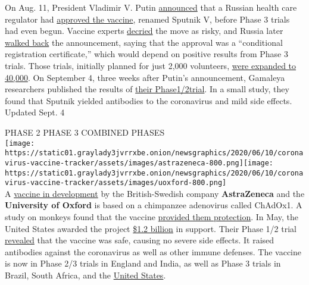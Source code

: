 On Aug. 11, President Vladimir V. Putin
\href{https://www.nytimes3xbfgragh.onion/2020/08/11/world/coronavirus-covid-19.html\#link-b092b4d}{announced}
that a Russian health care regulator had
\href{https://www.nytimes3xbfgragh.onion/2020/08/11/world/europe/russia-coronavirus-vaccine.html}{approved
the vaccine}, renamed Sputnik V, before Phase 3 trials had even begun.
Vaccine experts
\href{https://www.nytimes3xbfgragh.onion/2020/08/11/health/russia-covid-19-vaccine-safety.html}{decried}
the move as risky, and Russia later
\href{https://abcnews.go.com/International/russia-announces-expanded-trials-coronavirus-vaccine-approved-10/story?id=72497297}{walked
back} the announcement, saying that the approval was a ``conditional
registration certificate,'' which would depend on positive results from
Phase 3 trials. Those trials, initially planned for just 2,000
volunteers,
\href{https://clinicaltrials.gov/ct2/show/NCT04530396?term=vaccine\&recrs=abdf\&cond=COVID-19\&phase=0123\&sort=nwst\&draw=2\&rank=2}{were
expanded to 40,000}. On September 4, three weeks after Putin's
announcement, Gamaleya researchers published the results of
\href{https://www.nytimes3xbfgragh.onion/2020/09/04/health/russia-covid-vaccine.html?smid=tw-share}{their
Phase}\href{https://www.nytimes3xbfgragh.onion/2020/09/04/health/russia-covid-vaccine.html?smid=tw-share}{1/2}\href{https://www.nytimes3xbfgragh.onion/2020/09/04/health/russia-covid-vaccine.html?smid=tw-share}{trial}.
In a small study, they found that Sputnik yielded antibodies to the
coronavirus and mild side effects.\\
Updated Sept. 4

PHASE 2 PHASE 3 COMBINED PHASES\\
\texttt{[image: https://static01.graylady3jvrrxbe.onion/newsgraphics/2020/06/10/coronavirus-vaccine-tracker/assets/images/astrazeneca-800.png]}\texttt{[image: https://static01.graylady3jvrrxbe.onion/newsgraphics/2020/06/10/coronavirus-vaccine-tracker/assets/images/uoxford-800.png]}\\
A
\href{https://www.nytimes3xbfgragh.onion/2020/04/27/world/europe/coronavirus-vaccine-update-oxford.html}{vaccine
in development} by the British-Swedish company \textbf{AstraZeneca} and
the \textbf{University of Oxford} is based on a chimpanzee adenovirus
called ChAdOx1. A study on monkeys found that the vaccine
\href{https://www.nytimes3xbfgragh.onion/2020/07/30/health/covid-19-vaccine-monkeys.html}{provided
them protection}. In May, the United States awarded the project
\href{https://www.nytimes3xbfgragh.onion/2020/05/21/health/coronavirus-vaccine-astrazeneca.html?searchResultPosition=7}{\$1.2
billion} in support. Their Phase 1/2 trial
\href{https://www.thelancet.com/journals/lancet/article/PIIS0140-6736(20)31604-4/fulltext}{revealed}
that the vaccine was safe, causing no severe side effects. It raised
antibodies against the coronavirus as well as other immune defenses. The
vaccine is now in Phase 2/3 trials in England and India, as well as
Phase 3 trials in Brazil, South Africa, and the
\href{https://clinicaltrials.gov/ct2/show/NCT04516746?term=vaccine\&recrs=abdf\&cond=COVID-19\&phase=0123\&sort=nwst\&draw=2\&rank=1}{United
States}.

